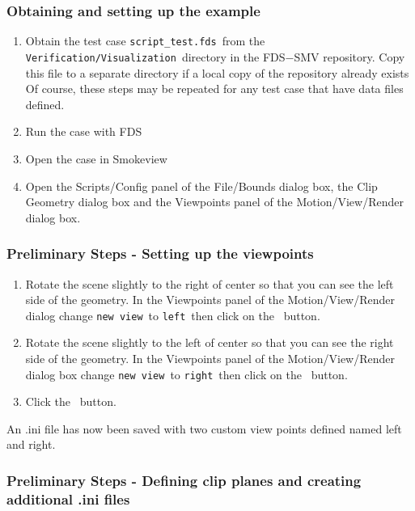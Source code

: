 \documentclass[11pt,twoside]{book}
\newcommand{\frameit}[1]{\fbox{\tt #1}}
\begin{document}
\subsubsection{Obtaining and setting up the example}

\begin{enumerate}
\item Obtain the test case {\tt script\_test.fds}\ from the
    {\tt Verification/Visualization}\ directory in
the FDS$-$SMV repository.  Copy this file to a separate directory
 if a local copy of the repository already exists
 Of course, these steps may be repeated
 for any test case that have data files defined.
\item Run the case with FDS \item Open the case in Smokeview \item
Open the Scripts/Config panel of the File/Bounds dialog
box, the Clip Geometry dialog box and the Viewpoints panel
of the Motion/View/Render dialog box.
\end{enumerate}

\subsubsection{Preliminary Steps - Setting up the viewpoints}

\begin{enumerate}
\item Rotate the scene slightly to the right of center so that you
can see the left side of the geometry.  In the Viewpoints panel of
the Motion/View/Render dialog change {\tt new view}\ to
{\tt left}\
    then click on the \frameit{Add}\ button.
\item Rotate the scene slightly to the left of center so that you
can see the right side of the geometry.  In the Viewpoints panel
of the Motion/View/Render dialog box change {\tt new view}\ to
{\tt right}\
    then click on the \frameit{Add}\ button.
\item Click the \frameit{Save Settings}\ button.
\end{enumerate}

An .ini file has now been saved with two custom view points defined named left and right.

\subsubsection{Preliminary Steps - Defining clip planes and creating additional .ini files}
\end{document}
